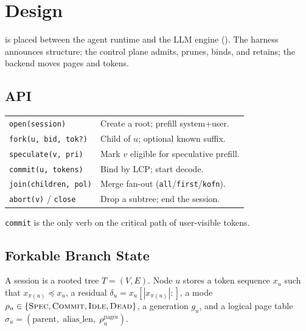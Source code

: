 \section{Design}
\label{sec:design}

\sys is placed between the agent runtime and the LLM engine ().
The harness announces structure; the control plane admits, prunes, binds, and retains; the backend moves pages and tokens.

\subsection{API}
\label{sec:overview}
\begin{center}
\footnotesize
\setlength{\tabcolsep}{3pt}
\begin{tabular}{@{}lp{}@{}}
\toprule
\texttt{open(session)} & Create a root; prefill system+user. \\
\texttt{fork(u, bid, tok?)} & Child of $u$; optional known suffix. \\
\texttt{speculate(v, pri)} & Mark $v$ eligible for speculative prefill. \\
\texttt{commit(u, tokens)} & Bind by LCP; start decode. \\
\texttt{join(children, pol)} & Merge fan-out (\texttt{all}/\texttt{first}/\texttt{kofn}). \\
\texttt{abort(v)} / \texttt{close} & Drop a subtree; end the session. \\
\bottomrule
\end{tabular}
\end{center}
\texttt{commit} is the only verb on the critical path of user-visible tokens.

\subsection{Forkable Branch State}
\label{sec:state}

\begin{definition}
A session is a rooted tree $T=(V,E)$.
Node $u$ stores a token sequence $x_u$ such that $x_{\pi(u)}\preceq x_u$, a residual $\delta_u=x_u[|x_{\pi(u)}|{:}]$, a mode $\rho_u\in\{\textsc{Spec},\textsc{Commit},\textsc{Idle},\textsc{Dead}\}$, a generation $g_u$, and a logical page table
$\sigma_u=(\mathrm{parent},\;\mathrm{alias\_len},\;\rho^{\mathrm{pages}}_u)$.
\end{definition}


